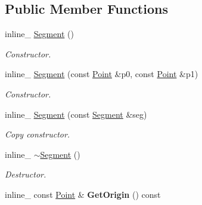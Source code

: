 \subsection*{Public Member Functions}
\begin{DoxyCompactItemize}
\item 
inline\+\_\+ \hyperlink{classSegment_ab067e08f6599ee1806e1d194e4a7a4e9}{Segment} ()\hypertarget{classSegment_ab067e08f6599ee1806e1d194e4a7a4e9}{}\label{classSegment_ab067e08f6599ee1806e1d194e4a7a4e9}

\begin{DoxyCompactList}\small\item\em Constructor. \end{DoxyCompactList}\item 
inline\+\_\+ \hyperlink{classSegment_a02406c475aa9c46fa205290109a762a1}{Segment} (const \hyperlink{classPoint}{Point} \&p0, const \hyperlink{classPoint}{Point} \&p1)\hypertarget{classSegment_a02406c475aa9c46fa205290109a762a1}{}\label{classSegment_a02406c475aa9c46fa205290109a762a1}

\begin{DoxyCompactList}\small\item\em Constructor. \end{DoxyCompactList}\item 
inline\+\_\+ \hyperlink{classSegment_a576715f83bfd385c7e71222fe3e77019}{Segment} (const \hyperlink{classSegment}{Segment} \&seg)\hypertarget{classSegment_a576715f83bfd385c7e71222fe3e77019}{}\label{classSegment_a576715f83bfd385c7e71222fe3e77019}

\begin{DoxyCompactList}\small\item\em Copy constructor. \end{DoxyCompactList}\item 
inline\+\_\+ \hyperlink{classSegment_ab64b9646af8a507fb06a1e838e236327}{$\sim$\+Segment} ()\hypertarget{classSegment_ab64b9646af8a507fb06a1e838e236327}{}\label{classSegment_ab64b9646af8a507fb06a1e838e236327}

\begin{DoxyCompactList}\small\item\em Destructor. \end{DoxyCompactList}\item 
inline\+\_\+ const \hyperlink{classPoint}{Point} \& {\bfseries Get\+Origin} () const \hypertarget{classSegment_a032468942d1ec87f4b63e21015917890}{}\label{classSegment_a032468942d1ec87f4b63e21015917890}


\end{DoxyCompactItemize}

